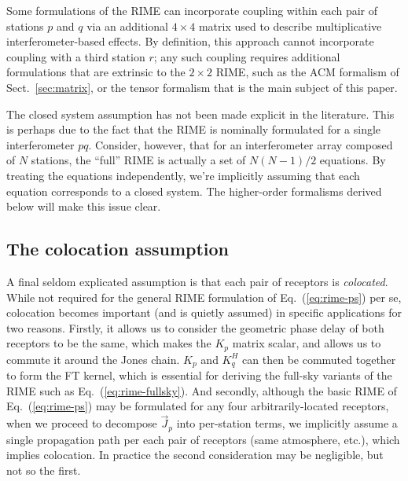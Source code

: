 \documentclass[]{aa}
\newcommand{\herm}{H}
\newcommand{\jones}[2]{\vec {#1}_{#2}}
\newcommand{\EDIT}[1]{#1}
\begin{document}
Some formulations of the RIME can incorporate coupling within each pair of stations $p$ and $q$ via an additional $4\times4$ matrix \citep[see e.g.][]{JEN:note185} used to describe multiplicative interferometer-based effects. By definition, this approach cannot incorporate coupling with a third station $r$; any such coupling requires additional formulations that are extrinsic to the $2\times2$ RIME, such as the ACM formalism of Sect.~\ref{sec:matrix}, or the tensor formalism that is the main subject of this paper.
 
The closed system assumption has not been made explicit in the literature. This is perhaps due to the fact that the RIME is nominally formulated for a single interferometer $pq$. Consider, however, that for an interferometer array composed of $N$ stations, the ``full'' RIME is actually a set of $N(N-1)/2$ equations. By treating the equations independently, we're implicitly assuming that each equation corresponds to a closed system. The higher-order formalisms derived below will make this issue clear.

\subsection{The colocation assumption}

A final seldom explicated assumption is that each pair of receptors is \emph{colocated}. \EDIT{While not required for the general RIME formulation of Eq.~(\ref{eq:rime-ps}) per se, colocation becomes important (and is quietly assumed) in specific applications for two reasons.} Firstly, it allows us to consider the geometric phase delay of both receptors to be the same, which makes the $K_p$ matrix scalar, and allows us to commute it around the Jones chain. $K_p$ and $K_q^\herm$ can then be commuted together to form the FT kernel, which is essential for deriving the full-sky variants of the RIME such as Eq.~(\ref{eq:rime-fullsky}). And secondly, although the basic RIME of Eq.~(\ref{eq:rime-ps}) may be formulated for any four arbitrarily-located receptors, when we proceed to decompose $\jones{J}{p}$ into per-station terms, we implicitly assume a single propagation path per each pair of receptors (same atmosphere, etc.), which implies colocation. In practice the second consideration may be negligible, but not so the first.
\end{document}
